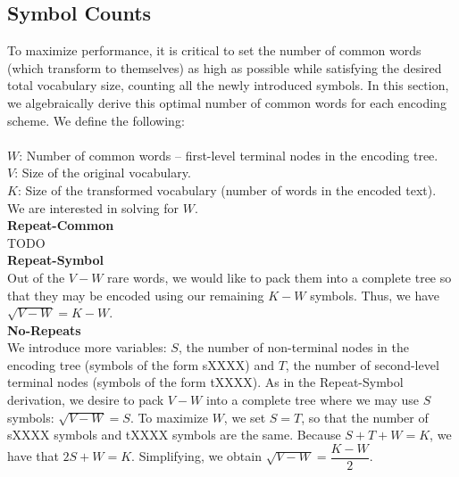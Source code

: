 \subsection{Symbol Counts}
To maximize performance, it is critical to set the number of common words (which
transform to themselves) as high as possible while satisfying the desired total vocabulary size,
counting all the newly introduced symbols. In this section, we algebraically derive
this optimal number of common words for each encoding scheme. We define the following:\\\\
$W$: Number of common words -- first-level terminal nodes in the encoding tree.\\
$V$: Size of the original vocabulary.\\
$K$: Size of the transformed vocabulary (number of words in the encoded text).\\

We are interested in solving for $W$.\\

\textbf{Repeat-Common}\\
TODO\\

\textbf{Repeat-Symbol}\\
Out of the $V - W$ rare words, we would like to pack them into a complete tree so that
they may be encoded using our remaining $K - W$ symbols. Thus, we have $\sqrt{V - W} = K - W$.\\

\textbf{No-Repeats}\\
We introduce more variables: $S$, the number of non-terminal nodes in the encoding tree (symbols
of the form sXXXX) and $T$, the number of second-level terminal nodes (symbols of the form tXXXX).
As in the Repeat-Symbol derivation, we desire to pack $V - W$ into a complete tree where we
may use $S$ symbols: $\sqrt{V - W} = S$. To maximize $W$, we set $S = T$, so that the number of sXXXX symbols and tXXXX
symbols are the same. Because $S + T + W = K$, we have that $2S + W = K$. Simplifying, we obtain
$\sqrt{V - W} = \dfrac{K - W}{2}$.\\